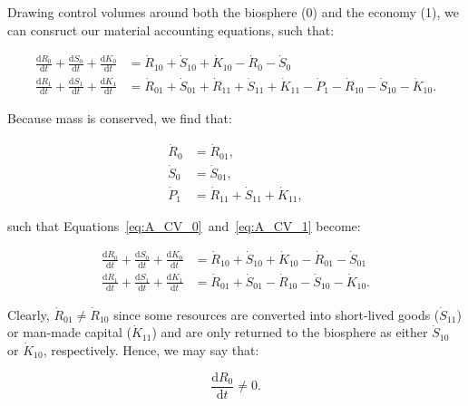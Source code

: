 Drawing control volumes around both the biosphere (0) and the economy (1), we can consruct
our material accounting equations, such that:

\begin{align} \label{eq:A_CV_0}
	\frac{\mathrm{d}R_0}{\mathrm{d}t}		
	+	\frac{\mathrm{d}S_0}{\mathrm{d}t}
	+	\frac{\mathrm{d}K_0}{\mathrm{d}t}		&	
	=	\dot{R}_{10}		
	+	\dot{S}_{10}	
	+	\dot{K}_{10}											
	-	\dot{R}_{0}											
	-	\dot{S}_{0}								\\
\label{eq:A_CV_1}
	\frac{\mathrm{d}R_{1}}{\mathrm{d}t}
	+ \frac{\mathrm{d}S_{1}}{\mathrm{d}t}
	+ \frac{\mathrm{d}K_{1}}{\mathrm{d}t}		&
	= \dot{R}_{01} 
	+ \dot{S}_{01} 
	+ \dot{R}_{11}
	+ \dot{S}_{11}
	+ \dot{K}_{11}
	- \dot{P}_{1}				
	- \dot{R}_{10}				
	- \dot{S}_{10}				
	- \dot{K}_{10}.
\end{align}



Because mass is conserved, we find that:

\begin{align} 
\label{eq:A_R0}
	\dot{R}_{0}				&
	= \dot{R}_{01},			\\
\label{eq:A_S0}
	\dot{S}_{0}				&
	= \dot{S}_{01},			\\
\label{eq:A_P1}
	\dot{P}_{1} 			&
	= \dot{R}_{11} 
	+ \dot{S}_{11}
	+ \dot{K}_{11},	
\end{align}

\noindent{}such that Equations~\ref{eq:A_CV_0}~and~\ref{eq:A_CV_1} 
become:

\begin{align} \label{eq:A_CV_0a}
	\frac{\mathrm{d}R_0}{\mathrm{d}t}		
	+	\frac{\mathrm{d}S_0}{\mathrm{d}t}
	+	\frac{\mathrm{d}K_0}{\mathrm{d}t}		&	
	=	\dot{R}_{10}		
	+	\dot{S}_{10}	
	+	\dot{K}_{10}											
	-	\dot{R}_{01}											
	-	\dot{S}_{01}								\\
\label{eq:A_CV_1a}
	\frac{\mathrm{d}R_{1}}{\mathrm{d}t}
	+ \frac{\mathrm{d}S_{1}}{\mathrm{d}t}
	+ \frac{\mathrm{d}K_{1}}{\mathrm{d}t}		&
	= \dot{R}_{01} 
	+ \dot{S}_{01} 
	- \dot{R}_{10}				
	- \dot{S}_{10}				
	- \dot{K}_{10}.
\end{align}

Clearly, $\dot{R}_{01} \neq \dot{R}_{10}$ 
since some resources are converted into
short-lived goods ($\dot{S}_{11}$) or man-made capital ($\dot{K}_{11}$)
and are only returned to the biosphere as either
$\dot{S}_{10}$ or $\dot{K}_{10}$, respectively. 
Hence,
we may say that:

\begin{equation}\label{eq:A_dR0_neq_0}
	\frac{\mathrm{d}R_0}{\mathrm{d}t}
	\neq 0.
\end{equation}

